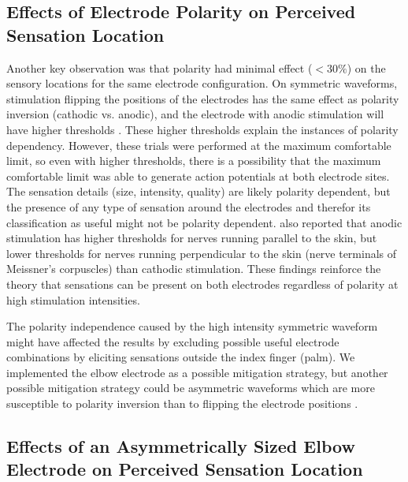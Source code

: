 \documentclass[10pt]{iopart}
\begin{document}
\subsection{Effects of Electrode Polarity on Perceived Sensation Location}

Another key observation was that polarity had minimal effect ($<30\%$) on the sensory locations for the same electrode configuration. On symmetric waveforms, stimulation flipping the positions of the electrodes has the same effect as polarity inversion (cathodic vs. anodic), and the electrode with anodic stimulation will have higher thresholds \cite{koivuniemi_asymmetric_2011}. These higher thresholds explain the instances of polarity dependency. However, these trials were performed at the maximum comfortable limit, so even with higher thresholds, there is a possibility that the maximum comfortable limit was able to generate action potentials at both electrode sites. The sensation details (size, intensity, quality) are likely polarity dependent, but the presence of any type of sensation around the electrodes and therefor its classification as useful might not be polarity dependent. \citeauthor{kajimoto_electro-tactile_2016} also reported that anodic stimulation has higher thresholds for nerves running parallel to the skin, but lower thresholds for nerves running perpendicular to the skin (nerve terminals of Meissner’s corpuscles) than cathodic stimulation. These findings reinforce the theory that sensations can be present on both electrodes regardless of polarity at high stimulation intensities. 

The polarity independence caused by the high intensity symmetric waveform might have affected the results by excluding possible useful electrode combinations by eliciting sensations outside the index finger (palm). We implemented the elbow electrode as a possible mitigation strategy, but another possible mitigation strategy could be asymmetric waveforms which are more susceptible to polarity inversion than to flipping the electrode positions \cite{koivuniemi_asymmetric_2011}.

\subsection{Effects of an Asymmetrically Sized Elbow Electrode on Perceived Sensation Location}
\end{document}
